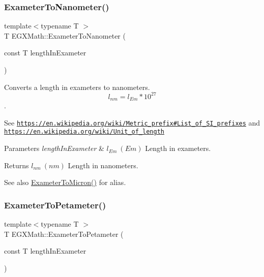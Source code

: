 \subsubsection{\texorpdfstring{Exameter\+To\+Nanometer()}{ExameterToNanometer()}}
{\footnotesize\ttfamily template$<$typename T $>$ \\
T E\+G\+X\+Math\+::\+Exameter\+To\+Nanometer (\begin{DoxyParamCaption}\item[{const T}]{length\+In\+Exameter }\end{DoxyParamCaption})}



Converts a length in exameters to nanometers. \[ l_{nm}=l_{Em} * 10^{27} \]. 

See \href{https://en.wikipedia.org/wiki/Metric_prefix#List_of_SI_prefixes}{\tt https\+://en.\+wikipedia.\+org/wiki/\+Metric\+\_\+prefix\#\+List\+\_\+of\+\_\+\+S\+I\+\_\+prefixes} and \href{https://en.wikipedia.org/wiki/Unit_of_length}{\tt https\+://en.\+wikipedia.\+org/wiki/\+Unit\+\_\+of\+\_\+length} 
\begin{DoxyParams}{Parameters}
{\em length\+In\+Exameter} & $ l_{Em}\ (Em)$ Length in exameters. \\
\hline
\end{DoxyParams}
\begin{DoxyReturn}{Returns}
$ l_{nm}\ (nm)$ Length in nanometers. 
\end{DoxyReturn}
\begin{DoxySeeAlso}{See also}
\mbox{\hyperlink{group___e_g_x_math-_conversions-_length_conversions-_exameter-_non-_s_i_ga3356bb6585e02757a196b299c29660c1}{Exameter\+To\+Micron()}} for alias. 
\end{DoxySeeAlso}
\mbox{\label{group___e_g_x_math-_conversions-_length_conversions-_exameter-_s_i_gadf7ed11d79b89826a108cd01e4f67769}} 
\subsubsection{\texorpdfstring{Exameter\+To\+Petameter()}{ExameterToPetameter()}}
{\footnotesize\ttfamily template$<$typename T $>$ \\
T E\+G\+X\+Math\+::\+Exameter\+To\+Petameter (\begin{DoxyParamCaption}\item[{const T}]{length\+In\+Exameter }\end{DoxyParamCaption})}



